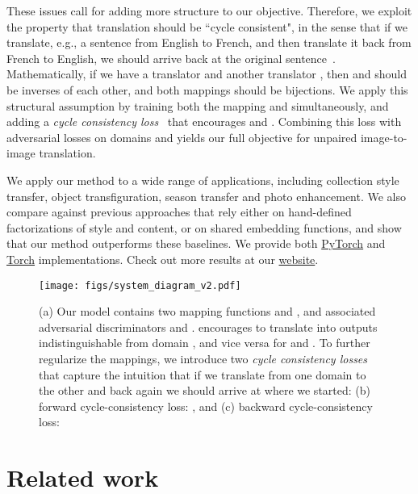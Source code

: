 \documentclass[10pt,twocolumn,letterpaper]{article}
\newcommand{\lblfig}[1]{\label{fig:#1}}
\newcommand{\lblsec}[1]{\label{sec:#1}}
\begin{document}
These issues call for adding more structure to our objective. Therefore, we exploit the property that translation should be ``cycle consistent", in the sense that if we translate, e.g., a sentence from English to French, and then translate it back from French to English, we should arrive back at the original sentence~\cite{brislin1970back}. Mathematically, if we have a translator  and another translator , then  and  should be inverses of each other, and both mappings should be bijections. We apply this structural assumption by training both the mapping  and  simultaneously, and adding a \emph{cycle consistency loss}~\cite{zhou2016learning} that encourages  and . Combining this loss with adversarial losses on domains  and  yields our full objective for unpaired image-to-image translation.


We apply our method to a wide range of applications, including collection style transfer, object transfiguration, season transfer and photo enhancement. We also compare against previous approaches that rely either on hand-defined factorizations of style and content, or on shared embedding functions, and show that our method outperforms these baselines. We provide both \href{https://github.com/junyanz/pytorch-CycleGAN-and-pix2pix}{PyTorch} and \href{https://github.com/junyanz/CycleGAN}{Torch} implementations. Check out more results at our \href{https://junyanz.github.io/CycleGAN/}{website}.



\begin{figure*}[th]
 \centering
 \texttt{[image: figs/system\_diagram\_v2.pdf]}
 \vspace{-0.2in}
  \caption{(a) Our model contains two mapping functions  and , and associated adversarial discriminators  and .  encourages  to translate  into outputs indistinguishable from domain , and vice versa for  and . To further regularize the mappings, we introduce two {\it cycle consistency losses} that capture the intuition that if we translate from one domain to the other and back again we should arrive at where we started: (b) forward cycle-consistency loss: , and (c) backward cycle-consistency loss:  }
 \lblfig{overview}
 \vspace{-0.2in}
\end{figure*}

 \section{Related work}
\lblsec{relatedwork}
\end{document}
